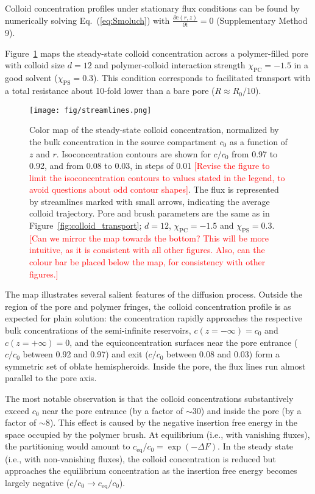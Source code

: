 \documentclass[12pt, a4paper]{article}
\newcommand\todo[1]{\textcolor{red}{#1}}
\begin{document}
Colloid concentration profiles under stationary flux conditions can be found by numerically solving Eq.~(\ref{eq:Smoluch}) with $\frac{\partial c(r,z)}{\partial t} = 0$  (Supplementary Method 9). 

Figure~\ref{fig:colloid_concentration} maps the steady-state colloid concentration across a polymer-filled pore with colloid size $d = 12$ and polymer-colloid interaction strength $\chi_{\text{PC}} = -1.5$ in a good solvent ($\chi_{\text{PS}} = 0.3$).
This condition corresponds to facilitated transport with a total resistance about 10-fold lower than a bare pore ($R \approx R_0/10$).

\begin{figure}
    \centering
    \texttt{[image: fig/streamlines.png]}
    \caption{
    Color map of the steady-state colloid concentration, normalized by the bulk concentration in the source compartment $c_0$ as a function of $z$ and $r$.
    Isoconcentration contours are shown for $c/c_0$ from 0.97 to 0.92, and from 0.08 to 0.03, in steps of 0.01
    \todo{[Revise the figure to limit the isoconcentration contours to values stated in the legend, to avoid questions about odd contour shapes]}.
    The flux is represented by streamlines marked with small arrows, indicating the average colloid trajectory.
    Pore and brush parameters are the same as in Figure~\ref{fig:colloid_transport}; $d = 12$, $\chi_{\text{PC}} = -1.5$ and $\chi_{\text{PS}} = 0.3$.
    \todo{[Can we mirror the map towards the bottom? This will be more intuitive, as it is consistent with all other figures. Also, can the colour bar be placed below the map, for consistency with other figures.]}
    }
    \label{fig:colloid_concentration}
\end{figure}

The map illustrates several salient features of the diffusion process.
Outside the region of the pore and polymer fringes, the colloid concentration profile is as expected for plain solution: the concentration rapidly approaches the respective bulk concentrations of the semi-infinite reservoirs, $c(z = -\infty) = c_0$ and $c(z = +\infty) = 0$, and the equiconcentration surfaces near the pore entrance ($c/c_0$ between 0.92 and 0.97) and exit ($c/c_0$ between 0.08 and 0.03) form a symmetric set of oblate hemispheroids.
Inside the pore, the flux lines run almost parallel to the pore axis.

The most notable observation is that the colloid concentrations substantively exceed $c_0$ near the pore entrance (by a factor of $\sim30$) and inside the pore (by a factor  of $\sim8$).
This effect is caused by the negative insertion free energy in the space occupied by the polymer brush.
At equilibrium (i.e., with vanishing fluxes), the partitioning would amount to $c_{\text{eq}}/c_0 = \exp\left( -\Delta F \right)$.
In the steady state (i.e., with non-vanishing fluxes), the colloid concentration is reduced but approaches the equilibrium concentration as the insertion free energy becomes largely negative ($c/c_0 \to c_{\text{eq}}/c_0$).
\end{document}
